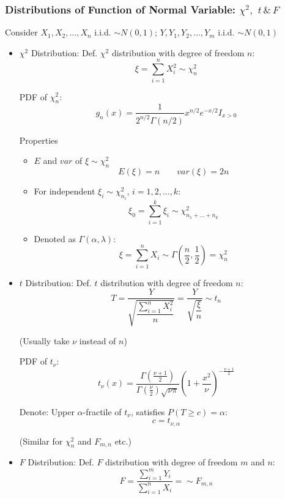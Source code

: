 \documentclass[11pt,a4paper]{ctexart}
\numberwithin{equation}{section}%
\begin{document}
    \subsubsection{Distributions of Function of Normal Variable: $\chi^2,$ $t\,\& \,F$}\label{chi2_t_F_properties}
        Consider $X_1,X_2,\ldots,X_n$ i.i.d. $\sim N(0,1)$; $Y,Y_1,Y_2,\ldots,Y_m$ i.i.d. $\sim N(0,1)$
        \begin{itemize}
            \item $\chi^2$ Distribution: Def. $\chi^2$ distribution with degree of freedom $n$:
            \[
                \xi =\sum_{i=1}^n X_i^2\sim \chi^2_n
            \]

            PDF of $\chi^2_n$:
            \[
                g_n(x)=\dfrac{1}{2^{n/2}\Gamma(n/2)}x^{n/2}e^{-x/2}I_{x>0}  
            \]

            Properties
            \begin{itemize}
                \item $E$ and $var$ of $\xi\sim\chi^2_n$
                \[E(\xi)=n\qquad var(\xi)=2n\]
                \item For independent $\xi_i\sim\chi^2_{n_i},\, i=1,2,\ldots,k$:\[
                    \xi_0=\sum_{i=1}^k\xi_i\sim\chi^2_{n_1+\ldots+n_k}\]
                \item Denoted as $\Gamma(\alpha,\lambda)$: \[\xi=\sum_{i=1}^nX_i\sim\Gamma(\frac{n}{2},\frac{1}{2})=\chi^2_n\]
            \end{itemize}
            \item $t$ Distribution: Def. $t$ distribution with degree of freedom $n$:
            \[
                T=\frac{Y}{\sqrt{\dfrac{\sum_{i=1}^nX_i^2}{n}}}=\frac{Y}{\sqrt{\dfrac{\xi}{n}}}\sim t_n
            \]

            (Usually take $\nu$ instead of $n$)

            PDF of $t_\nu$:
            \[t_\nu(x)=\dfrac{\Gamma(\frac{\nu+1}{2})}{\Gamma(\frac{\nu}{2})\sqrt{\nu\pi}}\left(1+\frac{x^2}{\nu}\right)^{-\frac{\nu+1}{2}}\]

            Denote: Upper $\alpha$-fractile of $t_\nu$, satisfies $P(T\geq c)=\alpha$:
            \[
                c=t_{\nu,\alpha}
            \]
            
            (Similar for $\chi^2_n$ and $F_{m,n}$ etc.)
            \item $F$ Distribution: Def. $F$ distribution with degree of freedom $m$ and $n$:
            \[
                F=\frac{\sum_{i=1}^mY_i}{\sum_{i=1}^nX_i}=\sim F_{m,n}
            \]


\end{itemize}
\end{document}
